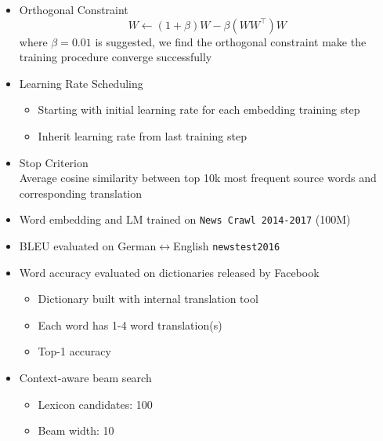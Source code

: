 \documentclass[11pt, a4paper, landscape]{article}
\begin{document}
	\NewPage
	\vfill
	\begin{itemize}
		\item Orthogonal Constraint
		\[ W \leftarrow (1+\beta) W - \beta(WW^\top)W\]
		where $\beta = 0.01$ is suggested, we find the orthogonal constraint make the training procedure converge successfully
		\item Learning Rate Scheduling 
		\begin{itemize}
			\item Starting with initial learning rate for each embedding training step
			\item Inherit learning rate from last training step
		\end{itemize}
		\item Stop Criterion\\
		Average cosine similarity between top 10k most frequent source words and corresponding translation
	\end{itemize}
	\vfill
	\NewPage
	\vfill
	\begin{itemize}
	\item Word embedding and LM trained on \texttt{News Crawl 2014-2017} (100M)
	\item BLEU evaluated on German$\leftrightarrow$English \texttt{newstest2016}
	\item {Word accuracy evaluated on  dictionaries released by Facebook}
		\begin{itemize}
			\item Dictionary built with internal translation tool
			\item Each word has 1-4 word translation(s)
			\item Top-1 accuracy			
		\end{itemize}
	\item Context-aware beam search
	\begin{itemize}
		\item Lexicon candidates: 100
		\item Beam width: 10
	\end{itemize}

	 
	\end{itemize}
	\vfill
	\NewPage
	\vfill
\begin{table}[]
	\centering
\end{table}
\end{document}
